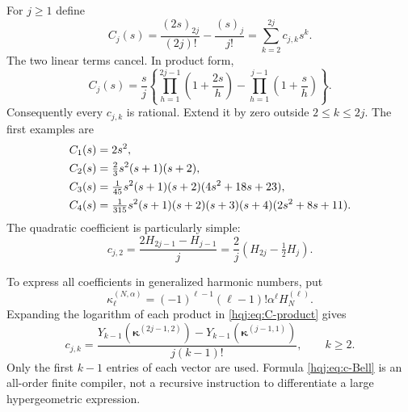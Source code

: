 \documentclass[11pt,letterpaper]{article}
\numberwithin{equation}{section}
\theoremstyle{definition}
\begin{document}
For $j\ge1$ define
\begin{equation}\label{hqj:eq:Cj}
C_j(s)=\frac{(2s)_{2j}}{(2j)!}-\frac{(s)_j}{j!}
=\sum_{k=2}^{2j}c_{j,k}s^k.
\end{equation}
The two linear terms cancel. In product form,
\begin{equation}\label{hqj:eq:C-product}
C_j(s)=\frac{s}{j}\left\{
\prod_{h=1}^{2j-1}\left(1+\frac{2s}{h}\right)
-\prod_{h=1}^{j-1}\left(1+\frac{s}{h}\right)\right\}.
\end{equation}
Consequently every $c_{j,k}$ is rational. Extend it by zero outside
$2\le k\le2j$. The first examples are
\begin{align}
C_1(s)&=2s^2,\notag\\
C_2(s)&=\tfrac23s^2(s+1)(s+2),\notag\\
C_3(s)&=\tfrac1{45}s^2(s+1)(s+2)(4s^2+18s+23),\label{hqj:eq:C-examples}\\
C_4(s)&=\tfrac1{315}s^2(s+1)(s+2)(s+3)(s+4)(2s^2+8s+11).\notag
\end{align}
The quadratic coefficient is particularly simple:
\begin{equation}\label{hqj:eq:c2}
c_{j,2}=\frac{2H_{2j-1}-H_{j-1}}j
=\frac2j\left(H_{2j}-\tfrac12H_j\right).
\end{equation}

To express all coefficients in generalized harmonic numbers, put
\[
\kappa_\ell^{(N,\alpha)}
=(-1)^{\ell-1}(\ell-1)!\alpha^\ell H_N^{(\ell)}.
\]
Expanding the logarithm of each product in \eqref{hqj:eq:C-product} gives
\begin{equation}\label{hqj:eq:c-Bell}
c_{j,k}=\frac{
Y_{k-1}(\bm\kappa^{(2j-1,2)})-
Y_{k-1}(\bm\kappa^{(j-1,1)})}{j(k-1)!},\qquad k\ge2.
\end{equation}
Only the first $k-1$ entries of each vector are used. Formula
\eqref{hqj:eq:c-Bell} is an all-order finite compiler, not a recursive
instruction to differentiate a large hypergeometric expression.
\end{document}
